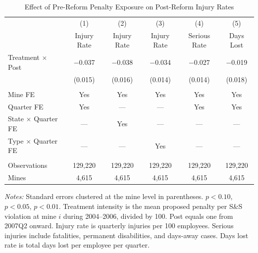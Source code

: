 \begin{table}[H]
\centering
\caption{Effect of Pre-Reform Penalty Exposure on Post-Reform Injury Rates}
\label{tab:main}
\begin{tabular}{lccccc}
\toprule
 & (1) & (2) & (3) & (4) & (5) \\
 & Injury Rate & Injury Rate & Injury Rate & Serious Rate & Days Lost \\
\midrule
Treatment $\times$ Post & $-$0.037\sym{**} & $-$0.038\sym{**} & $-$0.034\sym{**} & $-$0.027\sym{*} & $-$0.019 \\
 & (0.015) & (0.016) & (0.014) & (0.014) & (0.018) \\
\\
Mine FE & Yes & Yes & Yes & Yes & Yes \\
Quarter FE & Yes & --- & --- & Yes & Yes \\
State $\times$ Quarter FE & --- & Yes & --- & --- & --- \\
Type $\times$ Quarter FE & --- & --- & Yes & --- & --- \\
\\
Observations & 129,220 & 129,220 & 129,220 & 129,220 & 129,220 \\
Mines & 4,615 & 4,615 & 4,615 & 4,615 & 4,615 \\
\bottomrule
\end{tabular}
\par\vspace{0.3em}
{\footnotesize \textit{Notes:} Standard errors clustered at the mine level in parentheses. \sym{*} $p<0.10$, \sym{**} $p<0.05$, \sym{***} $p<0.01$. Treatment intensity is the mean proposed penalty per S\&S violation at mine $i$ during 2004--2006, divided by 100. Post equals one from 2007Q2 onward. Injury rate is quarterly injuries per 100 employees. Serious injuries include fatalities, permanent disabilities, and days-away cases. Days lost rate is total days lost per employee per quarter.}
\end{table}
